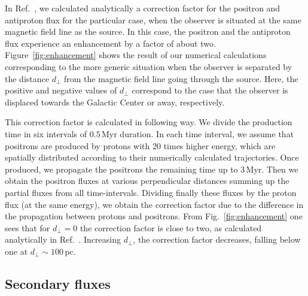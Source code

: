 \documentclass[prd,aps,twocolumn]{revtex4}
\begin{document}
In Ref.~\cite{PRL}, we calculated analytically a correction factor for the 
positron and antiproton flux for the particular case, when the observer is 
situated at the same magnetic field line as the source. In this case, the 
positron and the antiproton flux experience an enhancement by a factor of 
about two. Figure~\ref{fig:enhancement} shows the result of our numerical
calculations corresponding to the more generic situation when the observer 
is separated by the distance $d_\perp$ from the magnetic field line going 
through the source. Here, the positive and negative values of $d_\perp$ 
correspond to the case that the observer is displaced towards the Galactic 
Center or away, respectively.

This correction factor is calculated in following way. We divide the production
time in six intervals of $0.5$\,Myr duration. In each time interval, we assume 
that positrons are produced by protons with 20 times higher energy, which
are spatially distributed according to their numerically calculated 
trajectories. Once produced, we propagate the positrons the remaining time up 
to 3\,Myr. 
Then we obtain the positron fluxes at various perpendicular distances summing 
up the partial fluxes from all time-intervals. Dividing finally these 
fluxes by the proton flux (at the same energy), we obtain the
correction factor due to the difference in the propagation between protons and 
positrons.
From Fig.~\ref{fig:enhancement} one sees that for $d_\perp=0$  the correction
factor is close to two, as calculated analytically in Ref.~\cite{PRL}.
Increasing $d_\perp$,  the correction factor decreases, falling
below one at $d_\perp\sim 100$\,pc. 




\subsection{Secondary fluxes}
\end{document}
